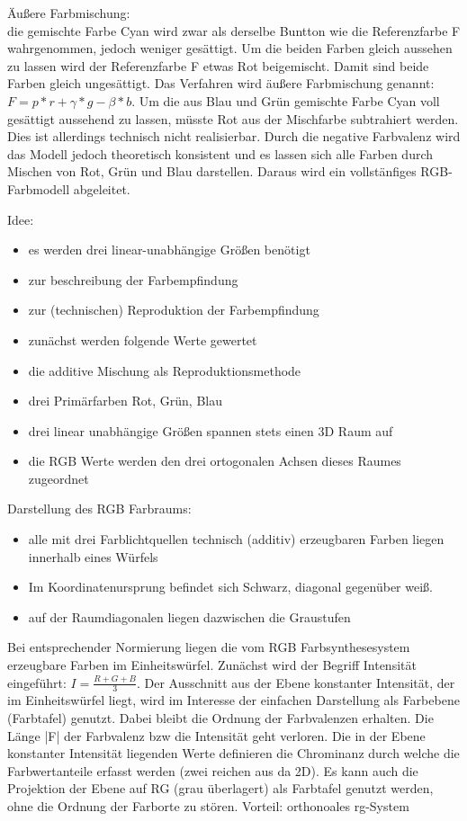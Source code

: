 \documentclass[10pt,landscape]{article}
\begin{document}
\begin{multicols}{3}
Äußere Farbmischung:\\
die gemischte Farbe Cyan wird zwar als derselbe Buntton wie die Referenzfarbe F wahrgenommen, jedoch weniger gesättigt. Um die beiden Farben gleich aussehen zu lassen wird der Referenzfarbe F etwas Rot beigemischt. Damit sind beide Farben gleich ungesättigt. Das Verfahren wird äußere Farbmischung genannt: $F=p*r + \gamma *g - \beta *b$.
Um die aus Blau und Grün gemischte Farbe Cyan voll gesättigt aussehend zu lassen, müsste Rot aus der Mischfarbe subtrahiert werden. Dies ist allerdings technisch nicht realisierbar. Durch die negative Farbvalenz wird das Modell jedoch theoretisch konsistent und es lassen sich alle Farben durch Mischen von Rot, Grün und Blau darstellen. Daraus wird ein vollstänfiges RGB-Farbmodell abgeleitet.

Idee:
\begin{itemize}
  \item es werden drei linear-unabhängige Größen benötigt
  \item zur beschreibung der Farbempfindung
  \item zur (technischen) Reproduktion der Farbempfindung
  \item zunächst werden folgende Werte gewertet
  \item die additive Mischung als Reproduktionsmethode
  \item drei Primärfarben Rot, Grün, Blau
  \item drei linear unabhängige Größen spannen stets einen 3D Raum auf
  \item die RGB Werte werden den drei ortogonalen Achsen dieses Raumes zugeordnet
\end{itemize}

Darstellung des RGB Farbraums:
\begin{itemize}
  \item alle mit drei Farblichtquellen technisch (additiv) erzeugbaren Farben liegen innerhalb eines Würfels
  \item Im Koordinatenursprung befindet sich Schwarz, diagonal gegenüber weiß.
  \item auf der Raumdiagonalen liegen dazwischen die Graustufen
\end{itemize}

Bei entsprechender Normierung liegen die vom RGB Farbsynthesesystem erzeugbare Farben im Einheitswürfel. Zunächst wird der Begriff Intensität eingeführt: $I=\frac{R+G+B}{3}$. Der Ausschnitt aus der Ebene konstanter Intensität, der im Einheitswürfel liegt, wird im Interesse der einfachen Darstellung als Farbebene (Farbtafel) genutzt. Dabei bleibt die Ordnung der Farbvalenzen erhalten. Die Länge |F| der Farbvalenz bzw die Intensität geht verloren.
Die in der Ebene konstanter Intensität liegenden Werte definieren die Chrominanz durch welche die Farbwertanteile erfasst werden (zwei reichen aus da 2D). Es kann auch die Projektion der Ebene auf RG (grau überlagert) als Farbtafel genutzt werden, ohne die Ordnung der Farborte zu stören. Vorteil: orthonoales rg-System


\end{multicols}
\end{document}

